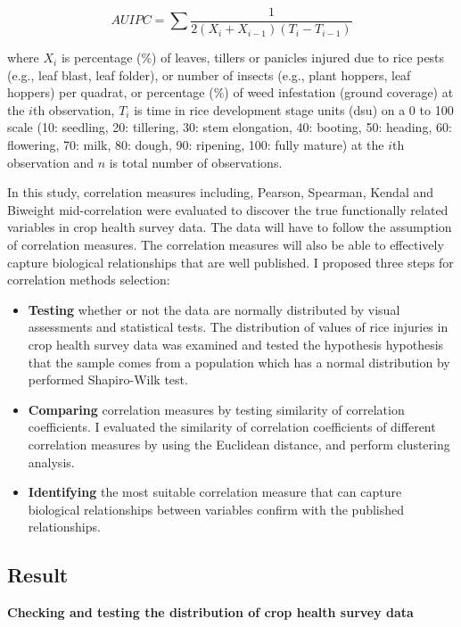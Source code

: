 \begin{equation}
AUIPC = \sum{\frac{1}{2(X_{i} + X_{i-1})(T_{i} - T_{i-1})}}
\end{equation}

where $X_i$ is percentage (\%) of leaves, tillers or panicles injured due to rice pests (e.g., leaf blast, leaf folder), or number of insects (e.g., plant hoppers, leaf hoppers) per quadrat, or percentage (\%) of weed infestation (ground coverage) at the $i$th observation, $T_i$ is time in rice development stage units (dsu) on a 0 to 100 scale (10: seedling, 20: tillering, 30: stem elongation, 40: booting, 50: heading, 60: flowering, 70: milk, 80: dough, 90: ripening, 100: fully mature) at the $i$th observation and $n$ is total number of observations.

In this study, correlation measures including, Pearson, Spearman, Kendal and Biweight mid-correlation \citep{Wilcox_2012_Introduction} were evaluated to discover the true functionally related variables in crop health survey data. The data will have to follow the assumption of correlation measures. The correlation measures will also be able to effectively capture biological relationships that are well published. I proposed three steps for correlation methods selection: 

\begin{itemize}
\item \textbf{Testing} whether or not the data are normally distributed by visual assessments and statistical tests. The distribution of values of rice injuries in crop health survey data was examined and tested the hypothesis hypothesis that the sample comes from a population which has a normal distribution by performed Shapiro-Wilk test.
\item \textbf{Comparing} correlation measures by testing similarity of correlation coefficients. I evaluated the similarity of correlation coefficients of different correlation measures by using the Euclidean distance, and perform clustering analysis.
\item \textbf{Identifying} the most suitable correlation measure that can capture biological relationships between variables confirm with the published relationships.
\end{itemize}

\subsection*{Result}

\textbf{Checking and testing the distribution of crop health survey data}


